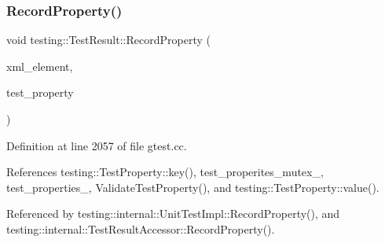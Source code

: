 \subsubsection{\texorpdfstring{Record\+Property()}{RecordProperty()}}
{\footnotesize\ttfamily void testing\+::\+Test\+Result\+::\+Record\+Property (\begin{DoxyParamCaption}\item[{const std\+::string \&}]{xml\+\_\+element,  }\item[{const \hyperlink{classtesting_1_1TestProperty}{Test\+Property} \&}]{test\+\_\+property }\end{DoxyParamCaption})\hspace{0.3cm}{\ttfamily [private]}}



Definition at line 2057 of file gtest.\+cc.



References testing\+::\+Test\+Property\+::key(), test\+\_\+properites\+\_\+mutex\+\_\+, test\+\_\+properties\+\_\+, Validate\+Test\+Property(), and testing\+::\+Test\+Property\+::value().



Referenced by testing\+::internal\+::\+Unit\+Test\+Impl\+::\+Record\+Property(), and testing\+::internal\+::\+Test\+Result\+Accessor\+::\+Record\+Property().


